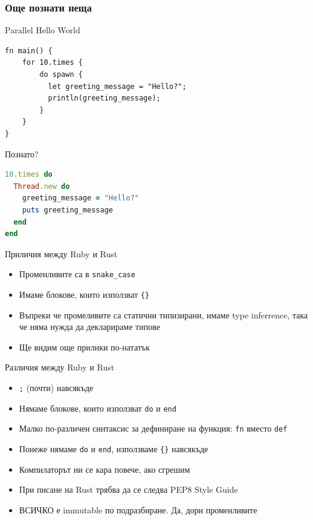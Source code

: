 \documentclass[xcolor=x11names,compress]{beamer}
\renewcommand{\(}{\begin{columns}}
\renewcommand{\)}{\end{columns}}
\newcommand{\<}[1]{\begin{column}{#1}}
\renewcommand{\>}{\end{column}}
\begin{document}
\begin{frame}[fragile]
  \frametitle{Още познати неща}

  \pause
  \begin{block}{Parallel Hello World}
    \begin{lstlisting}[basicstyle=\tiny]
fn main() {
    for 10.times {
        do spawn {
          let greeting_message = "Hello?";
          println(greeting_message);
        }
    }
}
    \end{lstlisting}
  \end{block}

  \pause
  \begin{block}{Познато?}
    \begin{lstlisting}[language=Ruby,basicstyle=\tiny]
10.times do
  Thread.new do
    greeting_message = "Hello?"
    puts greeting_message
  end
end
    \end{lstlisting}
  \end{block}
\end{frame}

\begin{frame}{Приличия между Ruby и Rust}
  \begin{itemize}[<+->]
  \item Променливите са в \texttt{snake\_case}
  \item Имаме блокове, които използват \texttt{\{\}}
  \item Въпреки че промеливите са статични типизирани, имаме type inferrence, така че няма нужда да декларираме типове
  \item Ще видим още прилики по-нататък
  \end{itemize}
\end{frame}

\begin{frame}{Различия между Ruby и Rust}
  \begin{itemize}[<+->]
  \item \texttt{;} (почти) навсякъде
  \item Нямаме блокове, които използват \texttt{do} и \texttt{end}
  \item Малко по-различен синтаксис за дефиниране на функция: \texttt{fn} вместо \texttt{def}
  \item Понеже нямаме \texttt{do} и \texttt{end}, използваме \texttt{\{\}} навсякъде
  \item Компилаторът ни се кара повече, ако сгрешим
  \item При писане на Rust трябва да се следва PEP8 Style Guide
  \item ВСИЧКО е immutable по подразбиране. \pause Да, дори променливите
  \end{itemize}
\end{frame}
\end{document}
